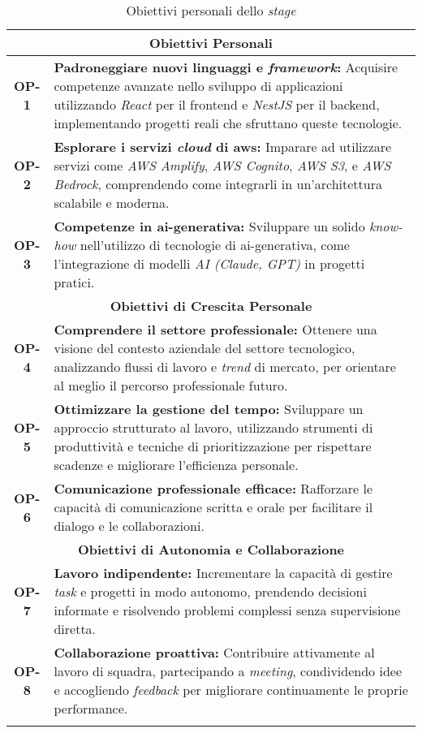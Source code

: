\begin{longtable}{|c|>{\centering\arraybackslash}p{}|}
    \hline
    \multicolumn{2}{|c|}{\rowcolor{green!30} \textbf{Obiettivi Personali}} \\
    \hline
    \textbf{OP-1} & \textbf{Padroneggiare nuovi linguaggi e \textit{framework}:} Acquisire competenze avanzate nello sviluppo di applicazioni utilizzando \textit{React} per il \gls{frontend} e \textit{NestJS} per il \gls{backend}, implementando progetti reali che sfruttano queste tecnologie. \\
    \hline
    \textbf{OP-2} & \textbf{Esplorare i servizi \textit{cloud} di \gls{aws}:} Imparare ad utilizzare servizi come \textit{AWS Amplify}, \textit{AWS Cognito}, \textit{AWS S3}, e \textit{AWS Bedrock}, comprendendo come integrarli in un’architettura scalabile e moderna. \\
    \hline
    \textbf{OP-3} & \textbf{Competenze in \gls{ai-generativa}:} Sviluppare un solido \textit{know-how} nell’utilizzo di tecnologie di \gls{ai-generativa}, come l’integrazione di modelli \textit{AI (Claude, GPT)} in progetti pratici. \\
    \hline
    \multicolumn{2}{|c|}{\rowcolor{green!30} \textbf{Obiettivi di Crescita Personale}} \\
    \hline
    \textbf{OP-4} & \textbf{Comprendere il settore professionale:} Ottenere una visione del contesto aziendale del settore tecnologico, analizzando flussi di lavoro e \textit{trend} di mercato, per orientare al meglio il percorso professionale futuro. \\
    \hline
    \textbf{OP-5} & \textbf{Ottimizzare la gestione del tempo:} Sviluppare un approccio strutturato al lavoro, utilizzando strumenti di produttività e tecniche di prioritizzazione per rispettare scadenze e migliorare l’efficienza personale. \\
    \hline
    \textbf{OP-6} & \textbf{Comunicazione professionale efficace:} Rafforzare le capacità di comunicazione scritta e orale per facilitare il dialogo e le collaborazioni. \\
    \hline
    \multicolumn{2}{|c|}{\rowcolor{green!30} \textbf{Obiettivi di Autonomia e Collaborazione}} \\
    \hline
    \textbf{OP-7} & \textbf{Lavoro indipendente:} Incrementare la capacità di gestire \textit{task} e progetti in modo autonomo, prendendo decisioni informate e risolvendo problemi complessi senza supervisione diretta. \\
    \hline
    \textbf{OP-8} & \textbf{Collaborazione proattiva:} Contribuire attivamente al lavoro di squadra, partecipando a \textit{meeting}, condividendo idee e accogliendo \textit{feedback} per migliorare continuamente le proprie performance. \\
    \hline
    \caption{Obiettivi personali dello \textit{stage}} %
    \label{tab:obiettivi-personali-stage} %
\end{longtable}
